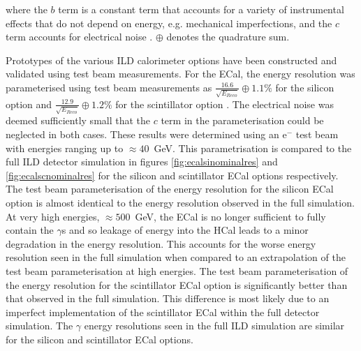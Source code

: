 \noindent where the $b$ term is a constant term that accounts for a variety of instrumental effects that do not depend on energy, e.g. mechanical imperfections, and the $c$ term accounts for electrical noise \cite{Fabjan:2003aq}.  $\oplus$ denotes the quadrature sum.  

Prototypes of the various ILD calorimeter options have been constructed and validated using test beam measurements.  For the ECal, the energy resolution was parameterised using test beam measurements as $\frac{16.6}{\sqrt{E_{Reco}}} \oplus 1.1 \%$ for the silicon option and $\frac{12.9}{\sqrt{E_{Reco}}} \oplus 1.2 \%$ for the scintillator option \cite{Behnke:2013lya}.  The electrical noise was deemed sufficiently small that the $c$ term in the parameterisation could be neglected in both cases.  These results were determined using an $\text{e}^{-}$ test beam with energies ranging up to $\approx 40$~GeV.  This parametrisation is compared to the full ILD detector simulation in figures \ref{fig:ecalsinominalres} and \ref{fig:ecalscnominalres} for the silicon and scintillator ECal options respectively.  The test beam parameterisation of the energy resolution for the silicon ECal option is almost identical to the energy resolution observed in the full simulation.  At very high energies, $\approx 500$~GeV, the ECal is no longer sufficient to fully contain the $\gamma$s and so leakage of energy into the HCal leads to a minor degradation in the energy resolution.  This accounts for the worse energy resolution seen in the full simulation when compared to an extrapolation of the test beam parameterisation at high energies.  The test beam parameterisation of the energy resolution for the scintillator ECal option is significantly better than that observed in the full simulation.  This difference is most likely due to an imperfect implementation of the scintillator ECal within the full detector simulation.  The $\gamma$ energy resolutions seen in the full ILD simulation are similar for the silicon and scintillator ECal options.      

